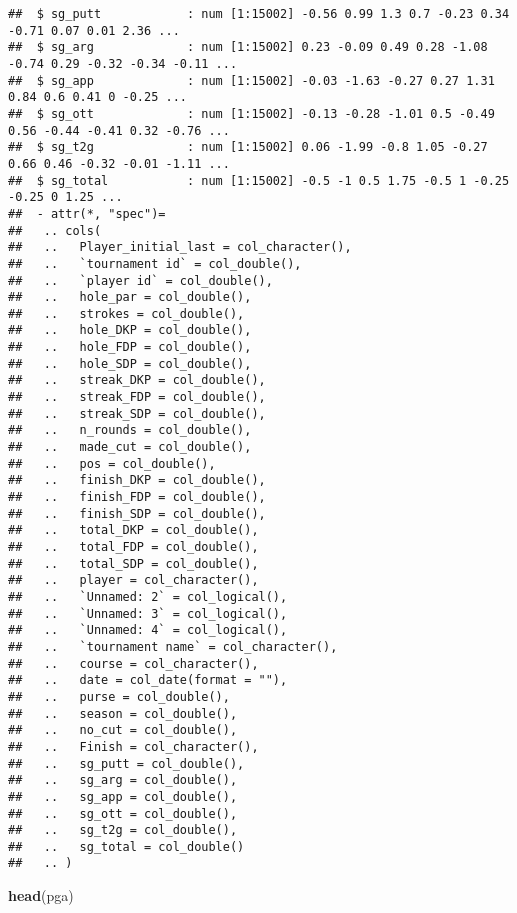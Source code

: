 \documentclass[
]{article}
\newenvironment{Shaded}{\begin{snugshade}}{\end{snugshade}}
\newcommand{\KeywordTok}[1]{\textcolor[rgb]{0.13,0.29,0.53}{\textbf{#1}}}
\newcommand{\NormalTok}[1]{#1}
\begin{document}
\begin{verbatim}
##  $ sg_putt            : num [1:15002] -0.56 0.99 1.3 0.7 -0.23 0.34 -0.71 0.07 0.01 2.36 ...
##  $ sg_arg             : num [1:15002] 0.23 -0.09 0.49 0.28 -1.08 -0.74 0.29 -0.32 -0.34 -0.11 ...
##  $ sg_app             : num [1:15002] -0.03 -1.63 -0.27 0.27 1.31 0.84 0.6 0.41 0 -0.25 ...
##  $ sg_ott             : num [1:15002] -0.13 -0.28 -1.01 0.5 -0.49 0.56 -0.44 -0.41 0.32 -0.76 ...
##  $ sg_t2g             : num [1:15002] 0.06 -1.99 -0.8 1.05 -0.27 0.66 0.46 -0.32 -0.01 -1.11 ...
##  $ sg_total           : num [1:15002] -0.5 -1 0.5 1.75 -0.5 1 -0.25 -0.25 0 1.25 ...
##  - attr(*, "spec")=
##   .. cols(
##   ..   Player_initial_last = col_character(),
##   ..   `tournament id` = col_double(),
##   ..   `player id` = col_double(),
##   ..   hole_par = col_double(),
##   ..   strokes = col_double(),
##   ..   hole_DKP = col_double(),
##   ..   hole_FDP = col_double(),
##   ..   hole_SDP = col_double(),
##   ..   streak_DKP = col_double(),
##   ..   streak_FDP = col_double(),
##   ..   streak_SDP = col_double(),
##   ..   n_rounds = col_double(),
##   ..   made_cut = col_double(),
##   ..   pos = col_double(),
##   ..   finish_DKP = col_double(),
##   ..   finish_FDP = col_double(),
##   ..   finish_SDP = col_double(),
##   ..   total_DKP = col_double(),
##   ..   total_FDP = col_double(),
##   ..   total_SDP = col_double(),
##   ..   player = col_character(),
##   ..   `Unnamed: 2` = col_logical(),
##   ..   `Unnamed: 3` = col_logical(),
##   ..   `Unnamed: 4` = col_logical(),
##   ..   `tournament name` = col_character(),
##   ..   course = col_character(),
##   ..   date = col_date(format = ""),
##   ..   purse = col_double(),
##   ..   season = col_double(),
##   ..   no_cut = col_double(),
##   ..   Finish = col_character(),
##   ..   sg_putt = col_double(),
##   ..   sg_arg = col_double(),
##   ..   sg_app = col_double(),
##   ..   sg_ott = col_double(),
##   ..   sg_t2g = col_double(),
##   ..   sg_total = col_double()
##   .. )
\end{verbatim}

\begin{Shaded}
\begin{Highlighting}[]
\KeywordTok{head}\NormalTok{(pga)}
\end{Highlighting}
\end{Shaded}
\end{document}
